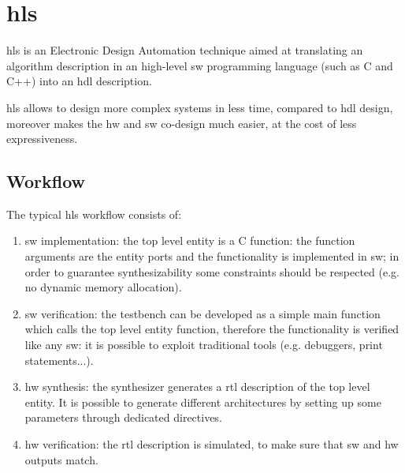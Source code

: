 \documentclass[11pt,a4paper,oneside]{memoir}
\begin{document}
\section{\acl{hls}}
\acf{hls} is an Electronic Design Automation technique aimed at translating an
algorithm description in an high-level \acl{sw} programming language (such as C
and C++) into an \ac{hdl} description.

\ac{hls} allows to design more complex systems in less time, compared to
\ac{hdl} design, moreover makes the \acl{hw} and \acl{sw} co-design much
easier, at the cost of less expressiveness.

\subsection{Workflow}
The typical \ac{hls} workflow consists of:
\begin{enumerate}
	\item \ac{sw} implementation: the top level entity is a C function:
		the function arguments are the entity ports and the
		functionality is implemented in \ac{sw}; in order to guarantee
		synthesizability some constraints should be respected (e.g. no
		dynamic memory allocation).
	\item \ac{sw} verification: the testbench can be developed as a simple
		main function which calls the top level entity function,
		therefore the functionality is verified like any \ac{sw}: it is
		possible to exploit traditional tools (e.g. debuggers, print
		statements...).
	\item \ac{hw} synthesis: the synthesizer generates a \ac{rtl}
		description of the top level entity. It is possible to generate
		different architectures by setting up some parameters through
		dedicated directives.
	\item \ac{hw} verification: the \ac{rtl} description is simulated, to
		make sure that \ac{sw} and \ac{hw} outputs match.
\end{enumerate}
\end{document}
